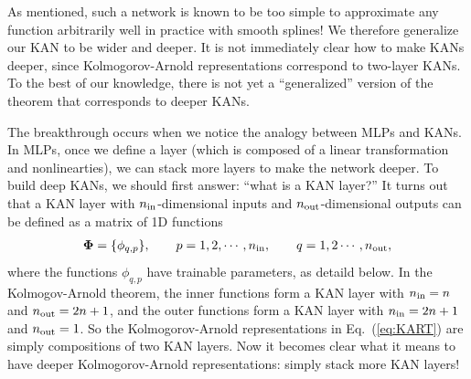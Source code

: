 \documentclass{article}
\numberwithin{equation}{section}
\numberwithin{figure}{section}
\begin{document}
As mentioned, such a network is known to be too simple to approximate any function arbitrarily well in practice with smooth splines! %
We therefore generalize our KAN to be wider and deeper. It is not immediately clear how to make KANs deeper, since Kolmogorov-Arnold representations correspond to two-layer KANs. To the best of our knowledge, there is not yet a ``generalized'' version of the theorem that corresponds to deeper KANs. 

The breakthrough occurs when we notice the analogy between MLPs and KANs. In MLPs, once we define a layer (which is composed of a linear transformation and nonlinearties), we can stack more layers to make the network deeper. To build deep KANs, we should first answer: ``what is a KAN layer?'' It turns out that a KAN layer with $n_{\rm in}$-dimensional inputs and $n_{\rm out}$-dimensional outputs can be defined as a matrix of 1D functions 
\begin{align}
    {\mathbf\Phi}=\{\phi_{q,p}\},\qquad p=1,2,\cdots,n_{\rm in},\qquad q=1,2\cdots,n_{\rm out},
\end{align}
where the functions $\phi_{q,p}$ have trainable parameters, as detaild below. In the Kolmogov-Arnold theorem, the inner functions form a KAN layer with $n_{\rm in}=n$ and $n_{\rm out}=2n+1$, and the outer functions form a KAN layer with $n_{\rm in}=2n+1$ and $n_{\rm out}=1$. So the Kolmogorov-Arnold representations in Eq.~(\ref{eq:KART}) are simply compositions of two KAN layers. Now it becomes clear what it means to have deeper Kolmogorov-Arnold representations: simply stack more KAN layers!

\end{document}

